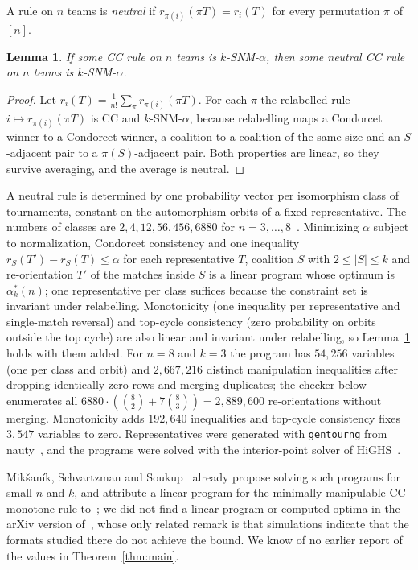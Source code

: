 \documentclass[11pt]{amsart}
\newtheorem{lemma}[theorem]{Lemma}
\theoremstyle{definition}
\theoremstyle{remark}
\begin{document}
A rule on $n$ teams is \emph{neutral} if $r_{\pi(i)}(\pi T)=r_i(T)$ for every permutation $\pi$ of $[n]$.

\begin{lemma}\label{lem:neutral}
If some CC rule on $n$ teams is $k$-SNM-$\alpha$, then some neutral CC rule on $n$ teams is $k$-SNM-$\alpha$.
\end{lemma}

\begin{proof}
Let $\bar r_i(T)=\frac1{n!}\sum_{\pi}r_{\pi(i)}(\pi T)$. For each $\pi$ the relabelled rule $i\mapsto r_{\pi(i)}(\pi T)$ is CC and $k$-SNM-$\alpha$, because relabelling maps a Condorcet winner to a Condorcet winner, a coalition to a coalition of the same size and an $S$-adjacent pair to a $\pi(S)$-adjacent pair. Both properties are linear, so they survive averaging, and the average is neutral.
\end{proof}

A neutral rule is determined by one probability vector per isomorphism class of tournaments, constant on the automorphism orbits of a fixed representative. The numbers of classes are $2,4,12,56,456,6880$ for $n=3,\dots,8$~\cite{OEIS568}. Minimizing $\alpha$ subject to normalization, Condorcet consistency and one inequality $r_S(T')-r_S(T)\le\alpha$ for each representative $T$, coalition $S$ with $2\le|S|\le k$ and re-orientation $T'$ of the matches inside $S$ is a linear program whose optimum is $\alpha^*_k(n)$; one representative per class suffices because the constraint set is invariant under relabelling. Monotonicity (one inequality per representative and single-match reversal) and top-cycle consistency (zero probability on orbits outside the top cycle) are also linear and invariant under relabelling, so Lemma~\ref{lem:neutral} holds with them added. For $n=8$ and $k=3$ the program has $54{,}256$ variables (one per class and orbit) and $2{,}667{,}216$ distinct manipulation inequalities after dropping identically zero rows and merging duplicates; the checker below enumerates all $6880\cdot(\binom82+7\binom83)=2{,}889{,}600$ re-orientations without merging. Monotonicity adds $192{,}640$ inequalities and top-cycle consistency fixes $3{,}547$ variables to zero. Representatives were generated with \texttt{gentourng} from nauty~\cite{McKayPiperno14}, and the programs were solved with the interior-point solver of HiGHS~\cite{HuangfuHall18}.

Mik\v{s}an\'ik, Schvartzman and Soukup~\cite[Section~5]{MSS24} already propose solving such programs for small $n$ and $k$, and attribute a linear program for the minimally manipulable CC monotone rule to~\cite{SSW17}; we did not find a linear program or computed optima in the arXiv version of~\cite{SSW17}, whose only related remark is that simulations indicate that the formats studied there do not achieve the bound. We know of no earlier report of the values in Theorem~\ref{thm:main}.
\end{document}
